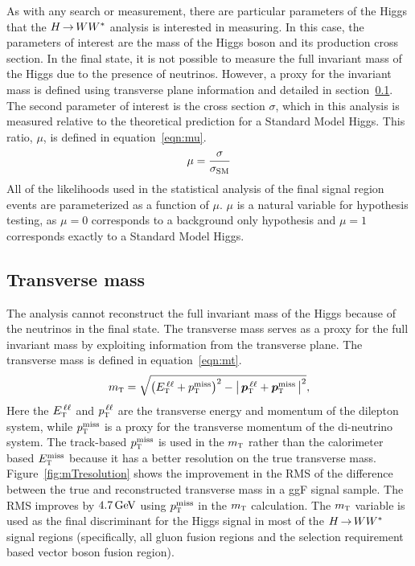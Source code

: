 As with any search or measurement, there are particular parameters of the Higgs that the $H{\,{\rightarrow}\,}WW^\ast$ analysis is interested in measuring. In this case, the parameters of interest are the mass of the Higgs boson and its production cross section. In the \HWWfull final state, it is not possible to measure the full invariant mass of the Higgs due to the presence of neutrinos. However, a proxy for the invariant mass is defined using transverse plane information and detailed in section~\ref{sec:mt}. The second parameter of interest is the cross section $\sigma$, which in this analysis is measured relative to the theoretical prediction for a Standard Model Higgs. This ratio, $\mu$, is defined in equation~\ref{eqn:mu}.
%
\begin{equation}
\mu = \frac{\sigma}{\sigma_{\rm SM}}
\label{eqn:mu}
\end{equation}
%
All of the likelihoods used in the statistical analysis of the final signal region events are parameterized as a function of $\mu$. $\mu$ is a natural variable for hypothesis testing, as $\mu = 0$ corresponds to a background only hypothesis and $\mu = 1$ corresponds exactly to a Standard Model Higgs. 

\subsection{Transverse mass}
\label{sec:mt}
The \HWWfull analysis cannot reconstruct the full invariant mass of the Higgs because of the neutrinos in the final state. The transverse mass serves as a proxy for the full invariant mass by exploiting information from the transverse plane. The transverse mass is defined in equation~\ref{eqn:mt}.
%
\begin{equation}
  m_{\textrm{\footnotesize\sc t}} = \sqrt{\left(E_{\textrm{\footnotesize\sc t}}^{\,\ell\ell} + p_{\textrm{\footnotesize\sc t}}^{\rm miss}\right)^2 - \left|\,\hbox{\bm{$p$}}_{\textrm{\footnotesize\sc t}}^{\,\ell\ell} + \hbox{\bm{$p$}}_{\textrm{\footnotesize\sc t}}^{\rm miss}\,\right|^2},
\label{eqn:mt}
\end{equation}
%
Here the $E_{\textrm{\footnotesize\sc t}}^{\,\ell\ell}$ and $p_{\textrm{\footnotesize\sc t}}^{\,\ell\ell}$ are the transverse energy and momentum of the dilepton system, while $p_{\textrm{\footnotesize\sc t}}^{\rm miss}$ is a proxy for the transverse momentum of the di-neutrino system. The track-based $p_{\textrm{\footnotesize\sc t}}^{\rm miss}$ is used in the $m_{\textrm{\footnotesize\sc t}}$ rather than the calorimeter based $E_{\textrm{\footnotesize\sc t}}^{\rm miss}$ because it has a better resolution on the true transverse mass. Figure~\ref{fig:mTresolution} shows the improvement in the RMS of the difference between the true and reconstructed transverse mass in a ggF signal sample. The RMS improves by $4.7 \GeV$ using $p_{\textrm{\footnotesize\sc t}}^{\rm miss}$ in the $m_{\textrm{\footnotesize\sc t}}$ calculation. The $m_{\textrm{\footnotesize\sc t}}$ variable is used as the final discriminant for the Higgs signal in most of the $H{\,{\rightarrow}\,}WW^\ast$ signal regions (specifically, all gluon fusion regions and the selection requirement based vector boson fusion region). 

